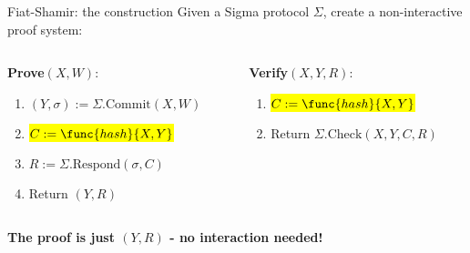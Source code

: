 \documentclass[aspectratio=169, lualatex, handout]{beamer}
\begin{document}
\begin{frame}{Fiat-Shamir: the construction}
	Given a Sigma protocol $\Sigma$, create a non-interactive proof system:\\[1em]
	\begin{columns}[c]
		\begin{column}{0.5\textwidth}
			\textbf{Prove}$(X, W)$:
			\begin{enumerate}
				\item $(Y, \sigma) := \Sigma.\text{Commit}(X, W)$
				\item \hl{$C := \func{hash}{X, Y}$}
				\item $R := \Sigma.\text{Respond}(\sigma, C)$
				\item Return $(Y, R)$
			\end{enumerate}
		\end{column}
		\begin{column}{0.5\textwidth}
			\textbf{Verify}$(X, Y, R)$:
			\begin{enumerate}
				\item \hl{$C := \func{hash}{X, Y}$}
				\item Return $\Sigma.\text{Check}(X, Y, C, R)$
			\end{enumerate}
		\end{column}
	\end{columns}
	\vspace{0.5em}
	\begin{center}
		\textbf{The proof is just $(Y, R)$ - no interaction needed!}
	\end{center}
\end{frame}
\end{document}
